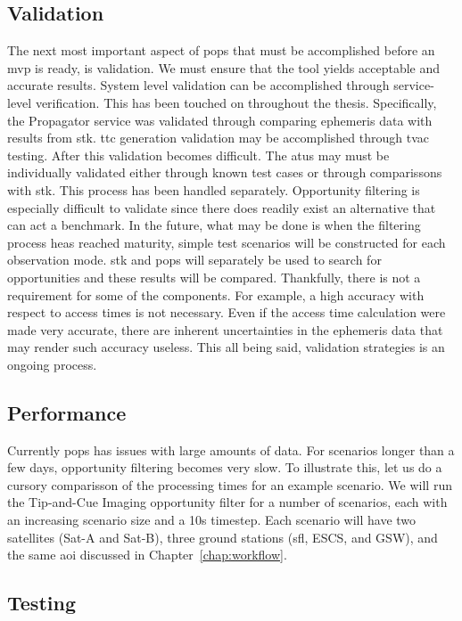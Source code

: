 \subsection{Validation}

The next most important aspect of \gls{pops} that must be accomplished before
an \gls{mvp} is ready, is validation. We must ensure that the tool yields
acceptable and accurate results. System level validation can be accomplished
through service-level verification. This has been touched on throughout the
thesis. Specifically, the Propagator service was validated through comparing
ephemeris data with results from \gls{stk}. \gls{ttc} generation validation may
be accomplished through \gls{tvac} testing. After this validation becomes
difficult. The \glspl{atu} may must be individually validated either through
known test cases or through comparissons with \gls{stk}. This process has been
handled separately. Opportunity filtering is especially difficult to validate
since there does readily exist an alternative that can act a benchmark. In the
future, what may be done is when the filtering process heas reached maturity,
simple test scenarios will be constructed for each observation mode. \gls{stk}
and \gls{pops} will separately be used to search for opportunities and these
results will be compared. Thankfully, there is not a requirement for some of
the components. For example, a high accuracy with respect to access times is
not necessary. Even if the access time calculation were made very accurate,
there are inherent uncertainties in the ephemeris data that may render such
accuracy useless. This all being said, validation strategies is an ongoing
process.
 
%

\subsection{Performance}

Currently \gls{pops} has issues with large amounts of data. For scenarios
longer than a few days, opportunity filtering becomes very slow. To illustrate
this, let us do a cursory comparisson of the processing times for an example
scenario.  We will run the Tip-and-Cue Imaging opportunity filter for a number
of scenarios, each with an increasing scenario size and a 10s timestep. Each
scenario will have two satellites (Sat-A and Sat-B), three ground stations
(\acrshort{sfl}, ESCS, and GSW), and the same \gls{aoi} discussed in
Chapter~\ref{chap:workflow}.


\subsection{Testing}



